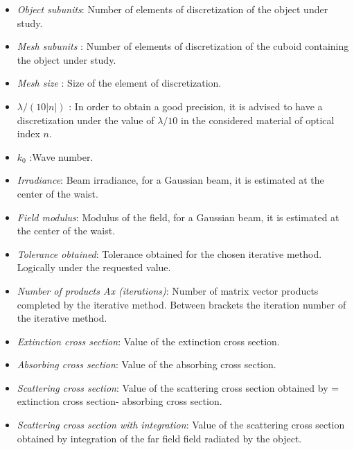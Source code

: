 \begin{itemize}

\item {\it Object subunits}: Number of elements of discretization of
  the  object under study.

\item {\it Mesh subunits} : Number of elements of discretization of
  the cuboid containing the object under study.

\item {\it Mesh size} : Size of the element of discretization.

\item $\lambda/(10|n|)$ : In order to obtain a good precision, it is
  advised to have a discretization under the value of $\lambda/10$ in
  the considered material of optical index $n$.

\item $k_0$ :Wave number.

\item {\it Irradiance}: Beam irradiance, for a Gaussian beam, it is
  estimated at the center of the waist.

\item {\it Field modulus}: Modulus of the field, for a Gaussian beam, it is 
estimated at the center of the waist.

\item {\it Tolerance obtained}: Tolerance obtained for the chosen iterative 
method. Logically under the requested value.

\item {\it Number of products Ax (iterations)}: Number of matrix
  vector products completed by the iterative method. Between brackets
  the iteration number of the iterative method.

\item {\it Extinction cross section}: Value of the extinction cross
  section.

\item {\it Absorbing cross section}: Value of the absorbing cross
  section.

\item {\it Scattering cross section}: Value of the scattering cross
  section obtained by = extinction cross section- absorbing cross
  section.

\item {\it Scattering cross section with integration}: Value of the
  scattering cross section obtained by integration of the far field
  field radiated by the object.


\end{itemize}
